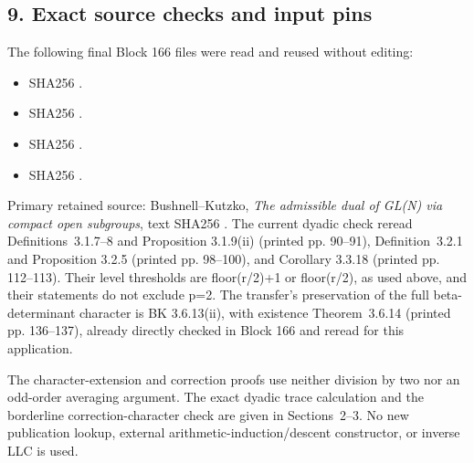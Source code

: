 \hypertarget{dyadic_character-exact-source-checks-and-input-pins}{%
\subsection{9. Exact source checks and input
pins}\label{dyadic_character-exact-source-checks-and-input-pins}}

The following final Block 166 files were read and reused without editing:

\begin{itemize}
\tightlist
\item
  SHA256
  .
\item
   SHA256
  .
\item
   SHA256
  .
\item
   SHA256
  .
\end{itemize}

Primary retained source: Bushnell--Kutzko, \emph{The admissible dual of
GL(N) via compact open subgroups}, text SHA256
.
The current dyadic check reread Definitions~3.1.7--8 and
Proposition 3.1.9(ii) (printed pp. 90--91), Definition~3.2.1 and
Proposition 3.2.5 (printed pp. 98--100), and Corollary 3.3.18
(printed pp. 112--113). Their level thresholds are floor(r/2)+1 or
floor(r/2), as used above, and their statements do not exclude p=2. The
transfer's preservation of the full beta-determinant character is
BK 3.6.13(ii), with existence Theorem~3.6.14 (printed pp. 136--137), already
directly checked in Block 166 and reread for this application.

The character-extension and correction proofs use neither division by
two nor an odd-order averaging argument. The exact dyadic trace
calculation and the borderline correction-character check are given in
Sections~2--3. No new publication lookup, external
arithmetic-induction/descent constructor, or inverse LLC is used.
